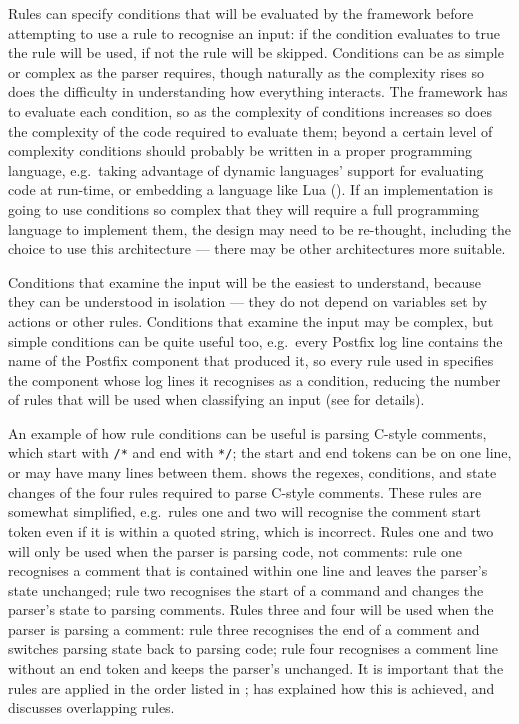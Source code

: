\label{attaching conditions to rules}

Rules can specify conditions that will be evaluated by the framework before
attempting to use a rule to recognise an input: if the condition evaluates
to true the rule will be used, if not the rule will be skipped.  Conditions
can be as simple or complex as the parser requires, though naturally as the
complexity rises so does the difficulty in understanding how everything
interacts.  The framework has to evaluate each condition, so as the
complexity of conditions increases so does the complexity of the code
required to evaluate them; beyond a certain level of complexity conditions
should probably be written in a proper programming language, e.g.\ taking
advantage of dynamic languages' support for evaluating code at run-time, or
embedding a language like Lua
().  If an
implementation is going to use conditions so complex that they will require
a full programming language to implement them, the design may need to be
re-thought, including the choice to use this architecture --- there may be
other architectures more suitable.

Conditions that examine the input will be the easiest to understand,
because they can be understood in isolation --- they do not depend on
variables set by actions or other rules.  Conditions that examine the input
may be complex, but simple conditions can be quite useful too, e.g.\ every
Postfix log \empty{}line contains the name of the Postfix component that
produced it, so every rule used in \parsername{} specifies the component
whose log \empty{}lines it recognises as a condition, reducing the number
of rules that will be used when classifying an input (see  for details).

An example of how rule conditions can be useful is parsing C-style
comments, which start with \texttt{/*} and end with \texttt{*/}; the start
and end tokens can be on one line, or may have many lines between them.
 shows the regexes, conditions,
and state changes of the four rules required to parse C-style comments.
These rules are somewhat simplified, e.g.\ rules one and two will recognise
the comment start token even if it is within a quoted string, which is
incorrect.  Rules one and two will only be used when the parser is parsing
code, not comments: rule one recognises a comment that is contained within
one line and leaves the parser's state unchanged; rule two recognises the
start of a command and changes the parser's state to parsing comments.
Rules three and four will be used when the parser is parsing a comment:
rule three recognises the end of a comment and switches parsing state back
to parsing code; rule four recognises a comment line without an end token
and keeps the parser's unchanged.  It is important that the rules are
applied in the order listed in ;
 has explained how this is achieved, and
 discusses overlapping rules.

